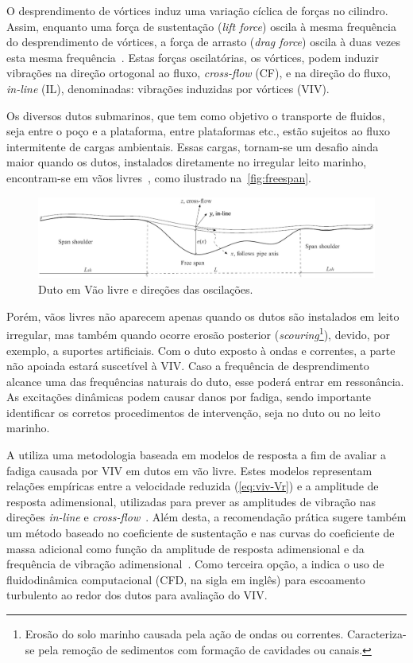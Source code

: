 O desprendimento de vórtices induz uma variação cíclica de forças no cilindro.
Assim, enquanto uma força de sustentação (\textit{lift force}) oscila à mesma frequência do desprendimento de vórtices, a força de arrasto (\textit{drag force}) oscila à duas vezes esta mesma frequência~\cite{Sumer1995}.
Estas forças oscilatórias, os vórtices, podem induzir vibrações na direção ortogonal ao fluxo, \textit{cross-flow} (CF), e na direção do fluxo, \textit{in-line} (IL), denominadas: vibrações induzidas por vórtices (VIV).

Os diversos dutos submarinos, que tem como objetivo o transporte de fluidos, seja entre o poço e a plataforma, entre plataformas etc., estão sujeitos ao fluxo intermitente de cargas ambientais.
Essas cargas, tornam-se um desafio ainda maior quando os dutos, instalados diretamente no irregular leito marinho, encontram-se em vãos livres~\cite{Fyrileiv1998}, como ilustrado na~\autoref{fig:freespan}.

\begin{figure}[!ht]
	\centering
    \caption{Duto em Vão livre e direções das oscilações.}\label{fig:freespan}
	\includegraphics[width=1\textwidth]{imagens/freespan}
\end{figure}

Porém, vãos livres não aparecem apenas quando os dutos são instalados em leito irregular, mas também quando ocorre erosão posterior (\textit{scouring}\footnote{Erosão do solo marinho causada pela ação de ondas ou correntes. Caracteriza-se pela remoção de sedimentos com formação de cavidades ou canais.}), devido, por exemplo, a suportes artificiais.
Com o duto exposto à ondas e correntes, a parte não apoiada estará suscetível à VIV.\@
Caso a frequência de desprendimento alcance uma das frequências naturais do duto, esse poderá entrar em ressonância.
As excitações dinâmicas podem causar danos por fadiga, sendo importante identificar os corretos procedimentos de intervenção, seja no duto ou no leito marinho.

A  utiliza uma metodologia baseada em modelos de resposta a fim de avaliar a fadiga causada por VIV em dutos em vão livre.
Estes modelos representam relações empíricas entre a velocidade reduzida (\autoref{eq:viv-Vr}) e a amplitude de resposta adimensional, utilizadas para prever as amplitudes de vibração nas direções \textit{in-line} e \textit{cross-flow}~\cite{Mork2003,DNV2017}.
Além desta, a recomendação prática sugere também um método baseado no coeficiente de sustentação e nas curvas do coeficiente de massa adicional como função da amplitude de resposta adimensional e da frequência de vibração adimensional~\cite{DNV2017}.
Como terceira opção, a  indica o uso de fluidodinâmica computacional (CFD, na sigla em inglês) para escoamento turbulento ao redor dos dutos para avaliação do VIV.\@

